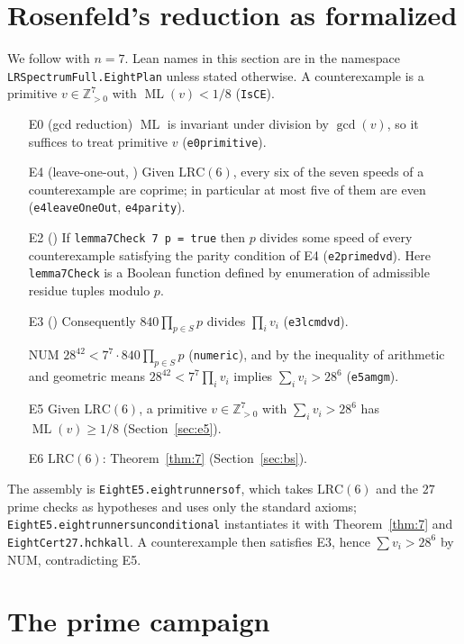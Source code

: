 \documentclass[11pt]{amsart}
\theoremstyle{plain}
\theoremstyle{definition}
\theoremstyle{remark}
\newcommand{\ML}{\operatorname{ML}}
\newcommand{\Z}{\mathbb{Z}}
\newcommand{\lean}[1]{{\def\_{\textunderscore\allowbreak}\def\.{.\allowbreak}\texttt{#1}}}
\newcommand{\LRC}{\mathrm{LRC}}
\begin{document}
\section{Rosenfeld's reduction as formalized}\label{sec:ros}

We follow \cite[Section~5]{ros8} with $n=7$. Lean names in this section are in the namespace
\lean{LRSpectrumFull.EightPlan} unless stated otherwise. A counterexample is a primitive
$v\in\Z_{>0}^7$ with $\ML(v)<1/8$ (\lean{IsCE}).

\begin{itemize}
\item[E0] (gcd reduction) $\ML$ is invariant under division by $\gcd(v)$, so it suffices to treat
primitive $v$ (\lean{e0\_primitive}).
\item[E4] (leave-one-out, \cite[Lemma~5]{ros8}) Given $\LRC(6)$, every six of the seven speeds of a
counterexample are coprime; in particular at most five of them are even (\lean{e4\_leaveOneOut},
\lean{e4\_parity}).
\item[E2] (\cite[Lemmas~6, 7]{ros8}) If \lean{lemma7Check 7 p = true} then $p$ divides some speed of
every counterexample satisfying the parity condition of E4 (\lean{e2\_prime\_dvd}). Here
\lean{lemma7Check} is a Boolean function defined by enumeration of admissible residue tuples
modulo $p$.
\item[E3] (\cite[Lemma~4]{ros8}) Consequently $840\prod_{p\in S}p$ divides $\prod_iv_i$
(\lean{e3\_lcm\_dvd}).
\item[NUM] $28^{42}<7^7\cdot 840\prod_{p\in S}p$ (\lean{numeric}), and by the inequality of
arithmetic and geometric means $28^{42}<7^7\prod_i v_i$ implies $\sum_i v_i>28^6$
(\lean{e5\_amgm}).
\item[E5] Given $\LRC(6)$, a primitive $v\in\Z_{>0}^7$ with $\sum_iv_i>28^6$ has $\ML(v)\ge1/8$
(Section~\ref{sec:e5}).
\item[E6] $\LRC(6)$: Theorem~\ref{thm:7} (Section~\ref{sec:bs}).
\end{itemize}
The assembly is \lean{EightE5.eight\_runners\_of}, which takes $\LRC(6)$ and the $27$ prime checks
as hypotheses and uses only the standard axioms; \lean{EightE5.eight\_runners\_unconditional}
instantiates it with Theorem~\ref{thm:7} and \lean{EightCert27.hchk\_all}. A counterexample then
satisfies E3, hence $\sum v_i>28^6$ by NUM, contradicting E5.

\section{The prime campaign}\label{sec:primes}
\end{document}
